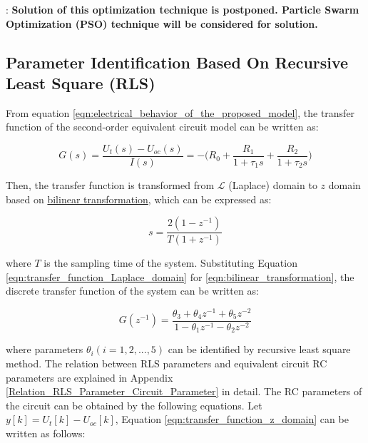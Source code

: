 \documentclass[12pt]{article}
\begin{document}
\par {}: \textbf{Solution of this optimization technique is postponed. Particle Swarm Optimization (PSO) technique will be considered for solution.}

\subsection{Parameter Identification Based On Recursive Least Square (RLS)\cite{Fazheng2019}} 
From equation \ref{eqn:electrical_behavior_of_the_proposed_model}, the transfer function of the second-order equivalent circuit model
can be written as:

\begin{equation}
	\label{eqn:transfer_function_Laplace_domain}
	G(s) = \frac{U_t(s) - U_{oc}(s)}{I(s)} = -\bigg(R_{0} + \frac{R_{1}}{1+\tau_{1}s} + \frac{R_{2}}{1+\tau_{2}s} \bigg)
\end{equation}

\noindent Then, the transfer function is transformed from $\mathcal{L}$ (Laplace) domain to $z$ domain based on \href{https://tttapa.github.io/Pages/Mathematics/Systems-and-Control-Theory/Digital-filters/Discretization/Bilinear-transform.html#:~:text=The%20bilinear%20transform%20is%20a,trapezoidal%20rule%20for%20numerical%20integration}{bilinear transformation}, which can be expressed as:

\begin{equation}
	\label{eqn:bilinear_transformation}
	s = \frac{2(1-z^{-1})}{T(1+z^{-1})}
\end{equation}

\noindent where $T$ is the sampling time of the system. Substituting Equation \ref{eqn:transfer_function_Laplace_domain} for \ref{eqn:bilinear_transformation}, the discrete transfer function of the system can be
written as:

\begin{equation}
	\label{eqn:transfer_function_z_domain}
	G(z^{-1}) = \frac{\theta_{3} + \theta_{4}z^{-1} + \theta_{5}z^{-2}}{1-\theta_{1}z^{-1}-\theta_{2}z^{-2}}
\end{equation}

\noindent where parameters $\theta_{i} (i = 1, 2, ..., 5)$ can be identified by recursive least square method. The relation between RLS parameters and equivalent circuit RC parameters are explained in Appendix \ref{Relation_RLS_Parameter_Circuit_Parameter} in detail. The RC parameters of the circuit can be obtained by the following equations. Let $y[k] = U_{t}[k] - U_{oc}[k]$, Equation \ref{eqn:transfer_function_z_domain} can be written as follows:
\end{document}
